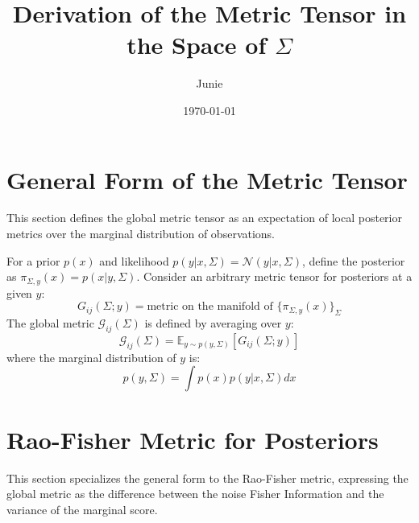 \documentclass{article}
\title{Derivation of the Metric Tensor in the Space of $\Sigma$}
\author{Junie}
\date{\today}
\begin{document}
\maketitle

\section{General Form of the Metric Tensor}
This section defines the global metric tensor as an expectation of local posterior metrics over the marginal distribution of observations.

For a prior $p(x)$ and likelihood $p(y|x, \Sigma) = \mathcal{N}(y|x, \Sigma)$, define the posterior as $\pi_{\Sigma, y}(x) = p(x | y, \Sigma)$. Consider an arbitrary metric tensor for posteriors at a given $y$:
\begin{equation} \label{eq:metric_at_y}
    G_{ij}(\Sigma; y) = \text{metric on the manifold of } \{\pi_{\Sigma, y}(x)\}_{\Sigma}
\end{equation}
The global metric $\mathcal{G}_{ij}(\Sigma)$ is defined by averaging over $y$:
\begin{equation} \label{eq:global_metric}
    \mathcal{G}_{ij}(\Sigma) = \mathbb{E}_{y \sim p(y, \Sigma)} [G_{ij}(\Sigma; y)]
\end{equation}
where the marginal distribution of $y$ is:
\begin{equation} \label{eq:marginal_y}
    p(y, \Sigma) = \int p(x) p(y | x, \Sigma) dx
\end{equation}

\section{Rao-Fisher Metric for Posteriors}
This section specializes the general form to the Rao-Fisher metric, expressing the global metric as the difference between the noise Fisher Information and the variance of the marginal score.
\end{document}
